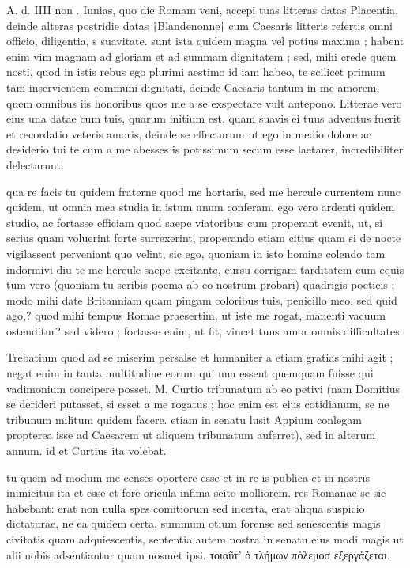 


 A. d. IIII non . Iunias, quo die Romam veni, accepi tuas litteras datas Placentia, deinde alteras postridie datas †Blandenonne† cum Caesaris litteris refertis omni officio, diligentia, s suavitate. sunt ista quidem magna vel potius maxima ; habent enim vim magnam ad gloriam et ad summam dignitatem ; sed, mihi crede quem nosti, quod in istis rebus ego plurimi aestimo id iam habeo, te scilicet primum tam inservientem communi dignitati, deinde Caesaris tantum in me amorem, quem omnibus iis honoribus quos me a se exspectare vult antepono. Litterae vero eius una datae cum tuis, quarum initium est, quam suavis ei tuus adventus fuerit et recordatio veteris amoris, deinde se effecturum ut ego in medio dolore ac desiderio tui te cum a me abesses is potissimum secum esse laetarer, incredibiliter delectarunt.

 qua re facis tu quidem fraterne quod me hortaris, sed me hercule currentem nunc quidem, ut omnia mea studia in istum unum conferam. ego vero ardenti quidem studio, ac fortasse efficiam quod saepe viatoribus cum properant evenit, ut, si serius quam voluerint forte surrexerint, properando etiam citius quam si de nocte vigilassent perveniant quo velint, sic ego, quoniam in isto homine colendo tam indormivi diu te me hercule saepe excitante, cursu corrigam tarditatem cum equis tum vero (quoniam tu scribis poema ab eo nostrum probari) quadrigis poeticis ; modo mihi date Britanniam quam pingam coloribus tuis, penicillo meo. sed quid ago,? quod mihi tempus Romae praesertim, ut iste me rogat, manenti vacuum ostenditur? sed videro ; fortasse enim, ut fit, vincet tuus amor omnis difficultates.

 Trebatium quod ad se miserim persalse et humaniter a etiam gratias mihi agit ; negat enim in tanta multitudine eorum qui una essent quemquam fuisse qui vadimonium concipere posset. M. Curtio tribunatum ab eo petivi (nam Domitius se derideri putasset, si esset a me rogatus ; hoc enim est eius cotidianum, se ne tribunum militum quidem facere. etiam in senatu lusit Appium conlegam propterea isse ad Caesarem ut aliquem tribunatum auferret), sed in alterum annum. id et Curtius ita volebat.

 tu quem ad modum me censes oportere esse et in re is publica et in nostris inimicitus ita et esse et fore oricula infima scito molliorem. res Romanae se sic habebant: erat non nulla spes comitiorum sed incerta, erat aliqua suspicio dictaturae, ne ea quidem certa, summum otium forense sed senescentis magis civitatis quam adquiescentis, sententia autem nostra in senatu eius modi magis ut alii nobis adsentiantur quam nosmet ipsi. τοιαῦτ' ὁ τλήμων πόλεμοσ ἐξεργάζεται.

